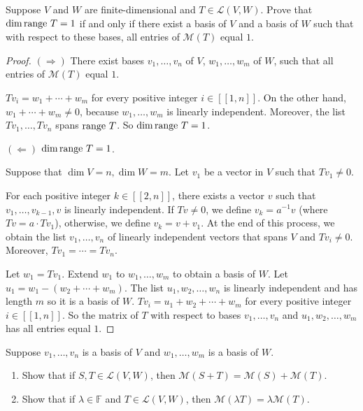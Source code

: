 \begin{exercise}
    Suppose $V$ and $W$ are finite-dimensional and $T \in \mathcal{L}(V, W)$. Prove that $\dim \operatorname{range}\,{T} = 1$ if and only if there exist a basis of $V$ and a basis of $W$ such that with respect to these bases, all entries of $\mathcal{M}(T)$ equal $1$.
\end{exercise}

\begin{proof}
    $(\Rightarrow)$ There exist bases $v_{1}, \ldots, v_{n}$ of $V$, $w_{1}, \ldots, w_{m}$ of $W$, such that all entries of $\mathcal{M}(T)$ equal $1$.

    $Tv_{i} = w_{1} + \cdots + w_{m}$ for every positive integer $i\in[\![1,n]\!]$. On the other hand, $w_{1} + \cdots + w_{m}\ne 0$, because $w_{1}, \ldots, w_{m}$ is linearly independent. Moreover, the list $Tv_{1}, \ldots, Tv_{n}$ spans $\operatorname{range}\,{T}$. So $\dim\operatorname{range}\,{T} = 1$.

    $(\Leftarrow)$ $\dim\operatorname{range}\,{T} = 1$.

    Suppose that $\dim V = n, \dim W = m$. Let $v_{1}$ be a vector in $V$ such that $Tv_{1}\ne 0$.

    For each positive integer $k \in [\![ 2, n ]\!]$, there exists a vector $v$ such that $v_{1}, \ldots, v_{k-1}, v$ is linearly independent. If $Tv \ne 0$, we define $v_{k} = a^{-1}v$ (where $Tv = a\cdot Tv_{1}$), otherwise, we define $v_{k} = v + v_{1}$. At the end of this process, we obtain the list $v_{1}, \ldots, v_{n}$ of linearly independent vectors that spans $V$ and $Tv_{i}\ne 0$. Moreover, $Tv_{1} = \cdots = Tv_{n}$.

    Let $w_{1} = Tv_{1}$. Extend $w_{1}$ to $w_{1}, \ldots, w_{m}$ to obtain a basis of $W$. Let $u_{1} = w_{1} - (w_{2} + \cdots + w_{m})$. The list $u_{1}, w_{2}, \ldots, w_{n}$ is linearly independent and has length $m$ so it is a basis of $W$. $Tv_{i} = u_{1} + w_{2} + \cdots + w_{m}$ for every positive integer $i\in[\![1,n]\!]$. So the matrix of $T$ with respect to bases $v_{1}, \ldots, v_{n}$ and $u_{1}, w_{2}, \ldots, w_{m}$ has all entries equal $1$.
\end{proof}
\newpage

\begin{exercise}
    Suppose $v_{1} , \ldots, v_{n}$ is a basis of $V$ and $w_{1} , \ldots, w_{m}$ is a basis of $W$.
    \begin{enumerate}[label={(\alph*)}]
        \item Show that if $S, T\in \mathcal{L}(V, W)$, then $\mathcal{M}(S + T) = \mathcal{M}(S) + \mathcal{M}(T)$.
        \item Show that if $\lambda\in\mathbb{F}$ and $T\in\mathcal{L}(V, W)$, then $\mathcal{M}(\lambda T) = \lambda \mathcal{M}(T)$.
    \end{enumerate}
\end{exercise}

